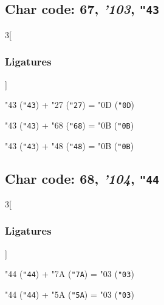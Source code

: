 \documentclass{article}
\newlength{\maxcharwidth}
\begin{document}
\subsection{Char code: 67, {\it'103}, {\tt"43}}
\label{char_67}


\begin{multicols}{3}[\subsubsection{Ligatures}]

{\testfont\char"43\noboundary} ({\tt"43}) + {\testfont\char"27\noboundary} ({\tt"27}) = {\testfont\char"0D\noboundary} ({\tt"0D}) 

{\testfont\char"43\noboundary} ({\tt"43}) + {\testfont\char"68\noboundary} ({\tt"68}) = {\testfont\char"0B\noboundary} ({\tt"0B}) 

{\testfont\char"43\noboundary} ({\tt"43}) + {\testfont\char"48\noboundary} ({\tt"48}) = {\testfont\char"0B\noboundary} ({\tt"0B}) 

\end{multicols}

\subsection{Char code: 68, {\it'104}, {\tt"44}}
\label{char_68}


\begin{multicols}{3}[\subsubsection{Ligatures}]

{\testfont\char"44\noboundary} ({\tt"44}) + {\testfont\char"7A\noboundary} ({\tt"7A}) = {\testfont\char"03\noboundary} ({\tt"03}) 

{\testfont\char"44\noboundary} ({\tt"44}) + {\testfont\char"5A\noboundary} ({\tt"5A}) = {\testfont\char"03\noboundary} ({\tt"03}) 

\end{multicols}
\end{document}
